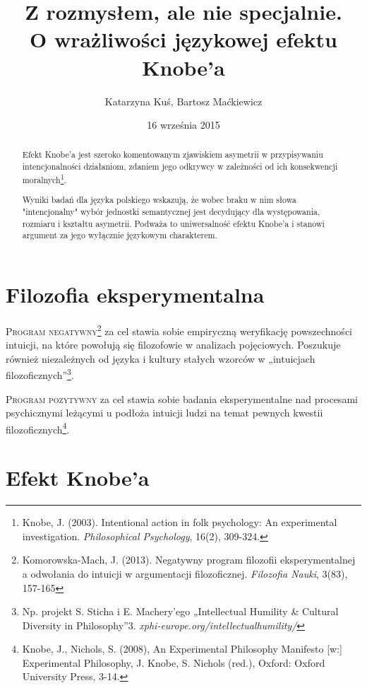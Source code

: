 \documentclass[a4paper]{tufte-handout}
\title{Z rozmysłem, ale nie specjalnie. \\ O wrażliwości językowej efektu Knobe'a}
\author[The Tufte-LaTeX Developers]{Katarzyna Kuś, Bartosz Maćkiewicz}
\date{16 września 2015}  %
\begin{document}
\maketitle%

\begin{abstract}
Efekt Knobe'a jest szeroko komentowanym zjawiskiem asymetrii w przypisywaniu intencjonalności działaniom, zdaniem jego odkrywcy w zależności od ich konsekwencji moralnych\footnote{Knobe, J. (2003). Intentional action in folk psychology: An experimental investigation. \textit{Philosophical Psychology}, 16(2), 309-324.}. 

Wyniki badań dla języka polskiego wskazują, że wobec braku w nim słowa "intencjonalny" wybór jednostki semantycznej jest decydujący dla występowania, rozmiaru i kształtu asymetrii. Podważa to uniwersalność efektu Knobe'a i stanowi argument za jego wyłącznie językowym charakterem.

\end{abstract}


\section{Filozofia eksperymentalna}\label{sec:page-layout}
\textsc{Program negatywny}\footnote{Komorowska-Mach, J. (2013). Negatywny program filozofii eksperymentalnej a odwołania do intuicji w argumentacji filozoficznej. \textit{Filozofia Nauki}, 3(83), 157-165} za cel stawia sobie empiryczną weryfikację powszechności intuicji, na które powołują się filozofowie w analizach pojęciowych. Poszukuje również niezależnych od języka i kultury stałych wzorców w „intuicjach filozoficznych”\footnote{Np. projekt S. Sticha i E. Machery’ego „Intellectual Humility \& Cultural Diversity in Philosophy”3. \textit{xphi-europe.org/intellectualhumility/}}.

\noindent \textsc{Program pozytywny} za cel stawia sobie badania eksperymentalne nad procesami psychicznymi leżącymi u podłoża intuicji ludzi na temat pewnych kwestii filozoficznych\footnote{Knobe, J., Nichols, S. (2008), An Experimental Philosophy Manifesto [w:] Experimental Philosophy, J. Knobe, S. Nichols (red.), Oxford: Oxford University Press, 3-14.}.

\section{Efekt Knobe'a}\label{sec:page-layout}
\end{document}
